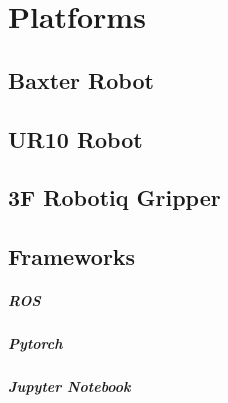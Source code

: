 \chapter{Platforms}
\label{chap:platforms}
\section{Baxter Robot}

\section{UR10 Robot}
\section{3F Robotiq Gripper}
\section{Frameworks}
\paragraph{ROS}
\paragraph{Pytorch}
\paragraph{Jupyter Notebook}